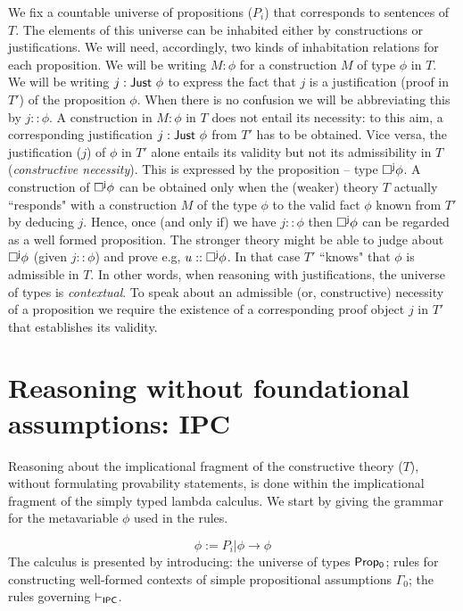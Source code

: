 \documentclass[11pt]{entcs}
\begin{document}
 
We fix a countable universe of propositions ($P_i$) that corresponds to  sentences of $T$. The elements of this universe can be inhabited either by constructions or justifications. We  will need, accordingly, two kinds of inhabitation relations for each proposition. We will be writing $M:\phi$ for a construction $M$ of type $\phi$ in $T$. We will be writing {$j: {\sf  Just}\  \phi$}  to express the fact that  {$j$} is a justification (proof in $T'$) of the proposition $\phi$. When there is no confusion we will be abbreviating this by {\sf $j:: \phi$}. A construction in $M:\phi$ in $T$ does not entail its necessity: to this aim, a corresponding justification {$j: {\sf  Just}\  \phi$} from $T'$ has to be obtained. Vice versa, the justification ($j$) of $\phi$ in $T'$ alone entails its validity but not its admissibility in $T$ (\textit{constructive  necessity}). This is expressed by the proposition -- type ${\sf \Box^{j}\phi}$. A construction of ${\sf \Box^{j}\phi}$ can be obtained only when the (weaker) theory $T$ actually ``responds" with a construction $M$ of the type $\phi$ to the valid fact $\phi$ known from $T'$ by deducing $j$. Hence, once (and only if) we have $j:: \phi$ then ${\sf\Box^{j}\phi}$ can be regarded as a well formed proposition. The  stronger theory might be able to judge about ${\sf\Box^{j}\phi}$ (given $j::\phi$) and prove e.g, $u::{\sf\Box^{j}\phi}$. In that case $T'$ ``knows"  that $\phi$ is admissible in $T$. In other words, when reasoning with justifications, the universe of types  is \textit{contextual}. To speak about  an admissible (or, constructive) necessity of a proposition we require the existence of a corresponding proof object $j$ in $T'$ that establishes its validity. 

\section{Reasoning without foundational assumptions: {\sf IPC}}\label{sec:IPC}

Reasoning about the implicational fragment of the constructive theory ($T$), without formulating provability statements, is done within the implicational fragment of the simply typed lambda calculus. We start by giving the grammar for the metavariable $\phi$ used in the rules.

\begin{displaymath}
\phi:= P_i | \phi \rightarrow \phi
\end{displaymath}
%
The calculus is presented by introducing: the universe of types {$\sf Prop_0$}; rules for constructing well-formed contexts of simple propositional assumptions $\Gamma_0$; the rules governing $\vdash_{{\sf IPC}}$.
\end{document}
